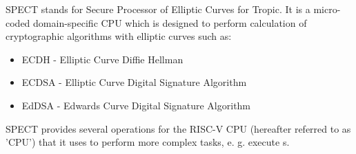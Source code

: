 \newcommand{\SPECTCommandHead}[2]{
    \multicolumn{4}{|X}{\cellcolor{TropicBlue}\color{white}\textbf{#1}} &
    \multicolumn{1}{|>{\hsize=0.5\hsize}X}{\cellcolor{TropicBlue!70}\color{white}\Register{SPECT_OP_ID}:} &
    \multicolumn{1}{|>{\hsize=0.5\hsize}X|}{\cellcolor{TropicBlue!70}\color{white}#2} \\ \hline
}

\newcommand{\SPECTCommandDescription}[1]{
    \multicolumn{6}{|p{.9\textwidth}|}{#1} \\ \hline
}

\newcommand{\SPECTCommandMemHead}[1]{
    \rowcolor{gray!70}
    \multicolumn{6}{|c|}{\color{white}#1} \\ \hline
}

\newcommand{\SPECTCommandMem}[3]{
    \multicolumn{1}{|>{\hsize=0.2\hsize}X}{#1} &
    \multicolumn{1}{|>{\hsize=0.2\hsize}X}{#2} &
    \multicolumn{4}{|>{\hsize=1.5\hsize}X|}{#3} \\ \hline
}

\newcommand{\SPECTCommandCtx}[2]{
    \rowcolor{gray!70}
    \multicolumn{3}{|X}{\color{white}Context In} & \multicolumn{3}{|X|}{\color{white}Context Out} \\ \hline
    \multicolumn{3}{|X}{#1} & \multicolumn{3}{|X|}{#2} \\ \hline
}

\newcommand{\SPECTCommandTable}[1]{
    \begin{xltabular}{\textwidth}{|XXXXXX|}
    \hline
    #1
    \end{xltabular}
}

\label{SPECTFIRMWARE}

SPECT stands for Secure Processor of Elliptic Curves for Tropic. It is a micro-coded
domain-specific CPU which is designed to perform calculation of cryptographic algorithms with elliptic curves such as:

\begin{itemize}
    \item ECDH - Elliptic Curve Diffie Hellman
    \item ECDSA - Elliptic Curve Digital Signature Algorithm
    \item EdDSA - Edwards Curve Digital Signature Algorithm
\end{itemize}

SPECT provides several operations for the RISC-V CPU (hereafter referred to as 'CPU') that
it uses to perform more complex tasks, e. g. execute \LLLCMD{}s.

